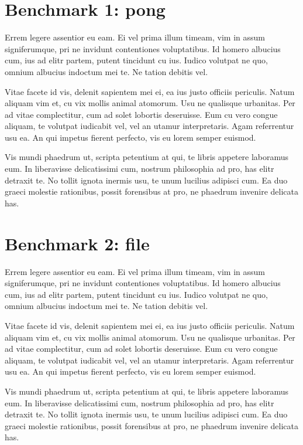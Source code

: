 \documentclass[a4paper,11pt,oneside]{report}
\begin{document}
\section{Benchmark 1: pong}

Errem legere assentior eu eam. Ei vel prima illum timeam, vim in assum
signiferumque, pri ne invidunt contentiones voluptatibus. Id homero albucius
cum, ius ad elitr partem, putent tincidunt cu ius. Iudico volutpat ne quo,
omnium albucius indoctum mei te. Ne tation debitis vel.

Vitae facete id vis, delenit sapientem mei ei, ea ius justo officiis
periculis. Natum aliquam vim et, cu vix mollis animal atomorum. Usu ne qualisque
urbanitas. Per ad vitae complectitur, cum ad solet lobortis deseruisse. Eum cu
vero congue aliquam, te volutpat iudicabit vel, vel an utamur
interpretaris. Agam referrentur usu ea. An qui impetus fierent perfecto, vis eu
lorem semper euismod.

Vis mundi phaedrum ut, scripta petentium at qui, te libris appetere laboramus
eum. In liberavisse delicatissimi cum, nostrum philosophia ad pro, has elitr
detraxit te. No tollit ignota inermis usu, te unum lucilius adipisci cum. Ea duo
graeci molestie rationibus, possit forensibus at pro, ne phaedrum invenire
delicata has.

\section{Benchmark 2: file}

Errem legere assentior eu eam. Ei vel prima illum timeam, vim in assum
signiferumque, pri ne invidunt contentiones voluptatibus. Id homero albucius
cum, ius ad elitr partem, putent tincidunt cu ius. Iudico volutpat ne quo,
omnium albucius indoctum mei te. Ne tation debitis vel.

Vitae facete id vis, delenit sapientem mei ei, ea ius justo officiis
periculis. Natum aliquam vim et, cu vix mollis animal atomorum. Usu ne qualisque
urbanitas. Per ad vitae complectitur, cum ad solet lobortis deseruisse. Eum cu
vero congue aliquam, te volutpat iudicabit vel, vel an utamur
interpretaris. Agam referrentur usu ea. An qui impetus fierent perfecto, vis eu
lorem semper euismod.

Vis mundi phaedrum ut, scripta petentium at qui, te libris appetere laboramus
eum. In liberavisse delicatissimi cum, nostrum philosophia ad pro, has elitr
detraxit te. No tollit ignota inermis usu, te unum lucilius adipisci cum. Ea duo
graeci molestie rationibus, possit forensibus at pro, ne phaedrum invenire
delicata has.
\end{document}
